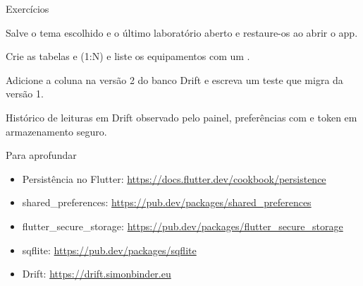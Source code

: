 \documentclass[aspectratio=169,10pt]{beamer}
\begin{document}
\begin{frame}{Exercícios}
  \begin{exercicio}
    Salve o tema escolhido e o último laboratório aberto e restaure-os ao abrir o app.
  \end{exercicio}
  \begin{exercicio}
    Crie as tabelas  e  (1:N) e liste os equipamentos com um .
  \end{exercicio}
  \begin{exercicio}
    Adicione a coluna  na versão 2 do banco Drift e escreva um teste que migra da versão 1.
  \end{exercicio}
  \begin{projeto}
    Histórico de leituras em Drift observado pelo painel, preferências com  e token em armazenamento seguro.
  \end{projeto}
\end{frame}

\begin{frame}{Para aprofundar}
  \small
  \begin{itemize}
    \item Persistência no Flutter: \url{https://docs.flutter.dev/cookbook/persistence}
    \item shared\_preferences: \url{https://pub.dev/packages/shared_preferences}
    \item flutter\_secure\_storage: \url{https://pub.dev/packages/flutter_secure_storage}
    \item sqflite: \url{https://pub.dev/packages/sqflite}
    \item Drift: \url{https://drift.simonbinder.eu}
  \end{itemize}
\end{frame}
\end{document}
